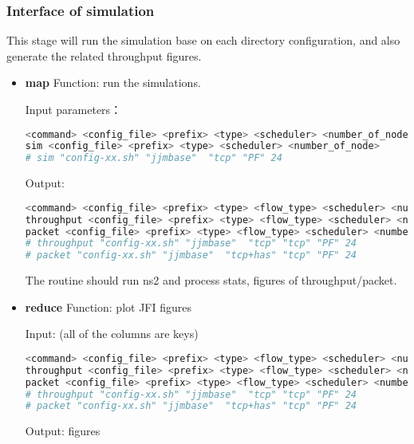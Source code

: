 \subsubsection{Interface of simulation}

This stage will run the simulation base on each directory configuration,
and also generate the related throughput figures.

\begin{itemize}
  \item \textbf{map}
Function: run the simulations.


Input parameters：
\begin{lstlisting}[language=bash]
<command> <config_file> <prefix> <type> <scheduler> <number_of_node>
sim <config_file> <prefix> <type> <scheduler> <number_of_node>
# sim "config-xx.sh" "jjmbase"  "tcp" "PF" 24
\end{lstlisting}


Output:
\begin{lstlisting}[language=bash]
<command> <config_file> <prefix> <type> <flow_type> <scheduler> <number_of_node>
throughput <config_file> <prefix> <type> <flow_type> <scheduler> <number_of_node>
packet <config_file> <prefix> <type> <flow_type> <scheduler> <number_of_node>
# throughput "config-xx.sh" "jjmbase"  "tcp" "tcp" "PF" 24
# packet "config-xx.sh" "jjmbase"  "tcp+has" "tcp" "PF" 24
\end{lstlisting}

The routine should run ns2 and process stats, figures of throughput/packet.




  \item \textbf{reduce}
Function: plot JFI figures


Input: (all of the columns are keys)
\begin{lstlisting}[language=bash]
<command> <config_file> <prefix> <type> <flow_type> <scheduler> <number_of_node>
throughput <config_file> <prefix> <type> <flow_type> <scheduler> <number_of_node>
packet <config_file> <prefix> <type> <flow_type> <scheduler> <number_of_node>
# throughput "config-xx.sh" "jjmbase"  "tcp" "tcp" "PF" 24
# packet "config-xx.sh" "jjmbase"  "tcp+has" "tcp" "PF" 24
\end{lstlisting}

Output: figures

\end{itemize}





